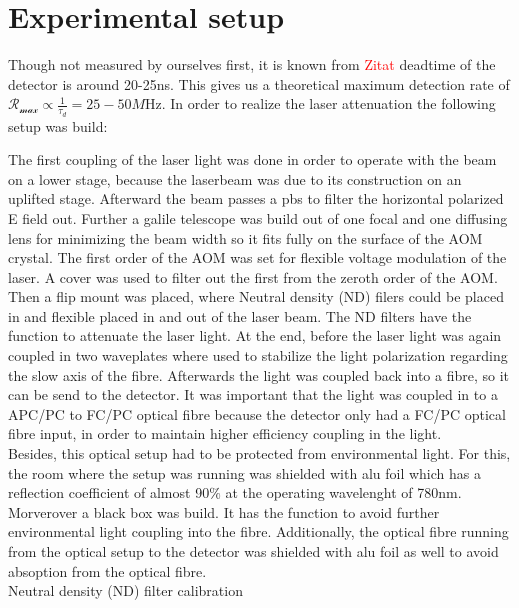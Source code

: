 \section{Experimental setup}

Though not measured by ourselves first, it is known from \textcolor{red}{Zitat} deadtime of the detector is around 20-25ns.
This gives us a theoretical maximum detection rate of $\mathcal{R_{\max}} \propto \frac{1}{\tau_{d}} = 25-50\si{M\Hz}$.
In order to realize the laser attenuation the following setup was build:

The first coupling of the laser light was done in order to operate with the beam on a lower stage, because the laserbeam 
was due to its construction on an uplifted stage. 
Afterward the beam passes a pbs to filter the horizontal polarized E field out. 
Further a galile telescope was build out of one focal and one diffusing lens for minimizing the beam width so it fits fully 
on the surface of the AOM crystal. The first order of the AOM was set for flexible voltage modulation of the laser.
A cover was used to filter out the first from the zeroth order of the AOM. Then a flip mount was placed, where 
Neutral density (ND) filers could be placed in and flexible placed in and out of the laser beam. 
The ND filters have the function to attenuate the laser light. 
At the end, before the laser light was again coupled in two waveplates where used to stabilize the light polarization regarding the
slow axis of the fibre. Afterwards the light was coupled back into a fibre, so it can be send to the detector.
It was important that the light was coupled in to a APC/PC to FC/PC optical fibre because the detector only had a FC/PC optical fibre
input, in order to maintain higher efficiency coupling in the light.\\

Besides, this optical setup had to be protected from environmental light. For this, the room where the setup was running was shielded 
with alu foil which has a reflection coefficient of almost 90$\%$ at the operating wavelenght of 780nm. 
Morverover a black box was build. It has the function to avoid further environmental light coupling into the fibre. Additionally, 
the optical fibre running from the optical setup to the detector was shielded with alu foil as well to avoid absoption from the optical 
fibre. \\

Neutral density (ND) filter calibration \\

